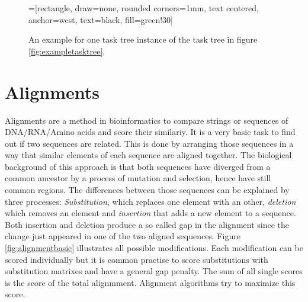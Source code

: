 	\begin{figure}
		=[rectangle, draw=none, rounded corners=1mm,
		        text centered, anchor=west, text=black, fill=green!30]
		
		\label{fig:exampletaskinstancetree}
		\caption{An example for one task tree instance of the task tree in figure \ref{fig:exampletasktree}\cite{harms2013}.}
	\end{figure}
\section{Alignments}
Alignments are a method in bioinformatics to compare strings or sequences of DNA/RNA/Amino acids and score their similariy. 
It is a very basic task to find out if two sequences are related. 
This is done by arranging those sequences in a way that similar elements of each sequence are aligned together. The biological background of this approach is that
both sequences have diverged from a common ancestor by a process of mutation and selection\cite{durbin1998}, hence have still common regions. The differences between those
sequences can be explained by three processes: \textit{Substitution}, which replaces one element with an other,  \textit{deletion} which removes an element and \textit{insertion} that adds a new element to a sequence.
Both insertion and deletion produce a so called gap in the alignment since the change just appeared in one of the two aligned sequences. Figure \ref{fig:alignmentbasic} illustrates all possible modifications.
Each modification can be scored individually but it is common practise to score substitutions with substitution matrixes and have a general gap penalty. The sum of all single scores is the score of the total alignmment.
Alignment algorithms try to maximize this score.

